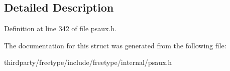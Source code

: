 \subsection{Detailed Description}


Definition at line 342 of file psaux.\+h.



The documentation for this struct was generated from the following file\+:\begin{DoxyCompactItemize}
\item 
thirdparty/freetype/include/freetype/internal/psaux.\+h\end{DoxyCompactItemize}
